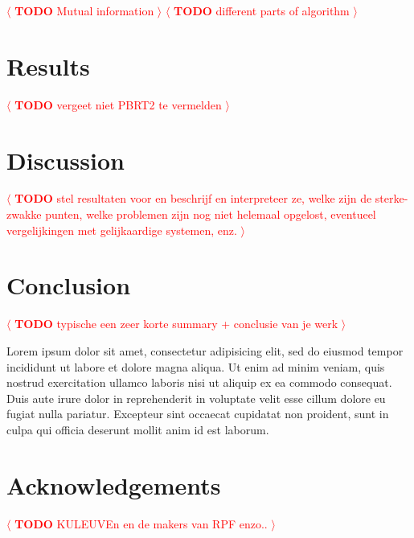 \documentclass[review]{acmsiggraph}
\newcommand{\todo}[1]{\textcolor{red}{\(\langle\) \textbf{TODO} #1 \(\rangle\) }}
\begin{document}
\todo{Mutual information}
\todo{different parts of algorithm}
\\


\section{Results}
\todo{vergeet niet PBRT2 te vermelden}
\section{Discussion}
\todo{stel resultaten voor en beschrijf en interpreteer ze, welke zijn de sterke-zwakke punten, welke problemen zijn nog niet helemaal opgelost, eventueel vergelijkingen met gelijkaardige systemen, enz.}
\\

\section{Conclusion}
\todo{typische een zeer korte summary + conclusie van je werk}

Lorem ipsum dolor sit amet, consectetur adipisicing elit, sed do
eiusmod tempor incididunt ut labore et dolore magna aliqua. Ut enim ad
minim veniam, quis nostrud exercitation ullamco laboris nisi ut
aliquip ex ea commodo consequat. Duis aute irure dolor in
reprehenderit in voluptate velit esse cillum dolore eu fugiat nulla
pariatur. Excepteur sint occaecat cupidatat non proident, sunt in
culpa qui officia deserunt mollit anim id est laborum.

\section*{Acknowledgements}
\todo{KULEUVEn en de makers van RPF enzo..}






\end{document}
